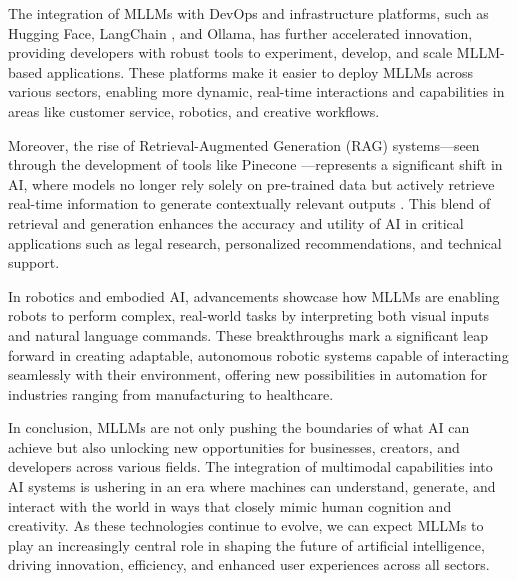 The integration of MLLMs with DevOps and infrastructure platforms, such as Hugging Face, LangChain \cite{chase2022langchain}, and Ollama, has further accelerated innovation, providing developers with robust tools to experiment, develop, and scale MLLM-based applications. These platforms make it easier to deploy MLLMs across various sectors, enabling more dynamic, real-time interactions and capabilities in areas like customer service, robotics, and creative workflows.

Moreover, the rise of Retrieval-Augmented Generation (RAG) systems—seen through the development of tools like Pinecone \cite{johnson2021pinecone}—represents a significant shift in AI, where models no longer rely solely on pre-trained data but actively retrieve real-time information to generate contextually relevant outputs \cite{lewis2020retrieval}. This blend of retrieval and generation enhances the accuracy and utility of AI in critical applications such as legal research, personalized recommendations, and technical support.

In robotics and embodied AI, advancements showcase how MLLMs are enabling robots to perform complex, real-world tasks by interpreting both visual inputs and natural language commands. These breakthroughs mark a significant leap forward in creating adaptable, autonomous robotic systems capable of interacting seamlessly with their environment, offering new possibilities in automation for industries ranging from manufacturing to healthcare.

In conclusion, MLLMs are not only pushing the boundaries of what AI can achieve but also unlocking new opportunities for businesses, creators, and developers across various fields. The integration of multimodal capabilities into AI systems is ushering in an era where machines can understand, generate, and interact with the world in ways that closely mimic human cognition and creativity. As these technologies continue to evolve, we can expect MLLMs to play an increasingly central role in shaping the future of artificial intelligence, driving innovation, efficiency, and enhanced user experiences across all sectors.

